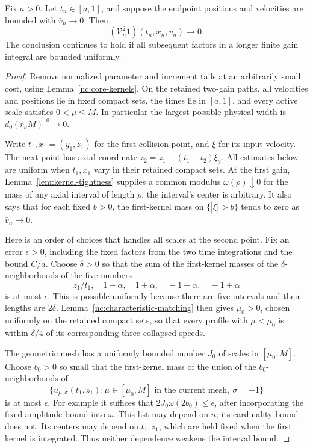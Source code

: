 \begin{lemma}
\label{nc:two-axial-gains}
Fix \(a>0\).  Let \(t_n\in[a,1]\), and suppose the endpoint
positions and velocities are bounded with \(\bar v_n\to0\).
Then
\[
 (\mathcal V_n^2 1)(t_n,x_n,v_n)\longrightarrow0.
\]
The conclusion continues to hold if all subsequent factors in a
longer finite gain integral are bounded uniformly.
\end{lemma}

\begin{proof}
Remove normalized parameter and increment tails at an arbitrarily
small cost, using Lemma~\ref{nc:core-kernels}.  On the retained
two-gain paths, all velocities and positions lie in fixed compact
sets, the times lie in \([a,1]\), and every active scale satisfies
\(0<\mu\le M\).  In particular the largest possible physical width
is \(d_0(r_nM)^{10}\to0\).

Write \(t_1,x_1=(y_1,z_1)\) for the first collision point, and
\(\xi\) for its input velocity.  The next point has axial coordinate
\(z_2=z_1-(t_1-t_2)\xi_3\).  All estimates below are uniform when
\(t_1,x_1\) vary in their retained compact sets.  At the first
gain, Lemma~\ref{lem:kernel-tightness} supplies a common modulus
\(\omega(\rho)\downarrow0\) for the mass of any axial interval of
length \(\rho\); the interval's center is arbitrary.  It also says
that for each fixed \(b>0\), the first-kernel mass on
\(\{|\bar\xi|>b\}\) tends to zero as \(\bar v_n\to0\).

Here is an order of choices that handles all scales at the second
point.  Fix an error \(\epsilon>0\), including the fixed factors
from the two time integrations and the bound \(C/a\).  Choose
\(\delta>0\) so that the sum of the first-kernel masses of the
\(\delta\)-neighborhoods of the five numbers
\begin{equation}
\label{nc:collapsed-speeds}
 z_1/t_1,\quad 1-\alpha,\quad1+\alpha,\quad
 -1-\alpha,\quad-1+\alpha
\end{equation}
is at most \(\epsilon\).  This is possible uniformly because
there are five intervals and their lengths are \(2\delta\).
Lemma~\ref{nc:characteristic-matching} then gives
\(\mu_0>0\), chosen uniformly on the retained compact sets, so that
every profile with \(\mu<\mu_0\) is within \(\delta/4\) of its
corresponding three collapsed speeds.

The geometric mesh has a uniformly bounded number \(J_0\) of
scales in \([\mu_0,M]\).  Choose \(b_0>0\) so small that the
first-kernel mass of the union of the \(b_0\)-neighborhoods of
\[
 \{u_{\mu,\sigma}(t_1,z_1):
       \mu\in[\mu_0,M]\text{ in the current mesh},\
       \sigma=\pm1\}
\]
is at most \(\epsilon\).  For example it suffices that
\(2J_0\omega(2b_0)\le\epsilon\), after incorporating the fixed
amplitude bound into \(\omega\).  This list may depend on \(n\);
its cardinality bound does not.  Its centers may depend on
\(t_1,z_1\), which are held fixed when the first kernel is
integrated.  Thus neither dependence weakens the interval bound.


\end{proof}
